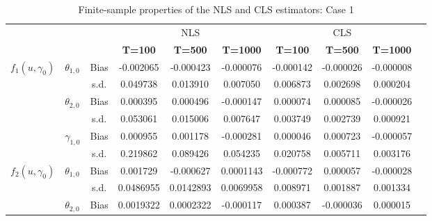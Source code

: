 \documentclass[12pt,a4paper]{article}
\begin{document}
	\begin{table}[htbp]
		\centering
		\caption{Finite-sample properties of the NLS and CLS estimators: Case 1}
		\begin{adjustbox}{max width=0.95\textwidth}
			\begin{tabular}{clcccccccc}
				\hline \hline
				&   &   & \multicolumn{3}{c}{NLS} & \multicolumn{3}{c}{CLS} \\
				&   &   & \textbf{T=100} & \textbf{T=500} & \textbf{T=1000} & \textbf{T=100} & \textbf{T=500} & \textbf{T=1000} \\
				\hline
				\multirow{6}[0]{*}{$f_1(u,\gamma_{0})$} & \multirow{2}[0]{*}{$\theta_{1,0}$} & Bias & -0.002065 & -0.000423 & -0.000076 & -0.000142 & -0.000026 & -0.000008 \\
				&   & s.d. & 0.049738 & 0.013910 & 0.007050 & 0.006873 & 0.002698 & 0.000204 \\
				& \multirow{2}[0]{*}{$\theta_{2,0}$} & Bias & 0.000395 & 0.000496 & -0.000147 & 0.000074 & 0.000085 & -0.000026 \\
				&   & s.d. & 0.053061 & 0.015006 & 0.007647 & 0.003749 & 0.002739 & 0.000921 \\
				& \multirow{2}[0]{*}{$\gamma_{1,0}$} & Bias & 0.000955 & 0.001178 & -0.000281 & 0.000046 & 0.000723 & -0.000057 \\
				&   & s.d. & 0.219862 & 0.089426 & 0.054235 & 0.020758 & 0.005711 & 0.003176 \\
				\hline
				\multirow{6}[0]{*}{$f_2(u,\gamma_{0})$} & \multirow{2}[0]{*}{$\theta_{1,0}$} & Bias & 0.001729 & -0.000627 & 0.0001143 & -0.000772 & 0.000057 & -0.000028 \\
				&   & s.d. & 0.0486955 & 0.0142893 & 0.0069958 & 0.008971 & 0.001887 & 0.001334 \\
				& \multirow{2}[0]{*}{$\theta_{2,0}$} & Bias & 0.0019322 & 0.0002322 & -0.000117 & 0.000387 & -0.000036 & 0.000015 \\

\end{tabular}
\end{adjustbox}
\end{table}
\end{document}
